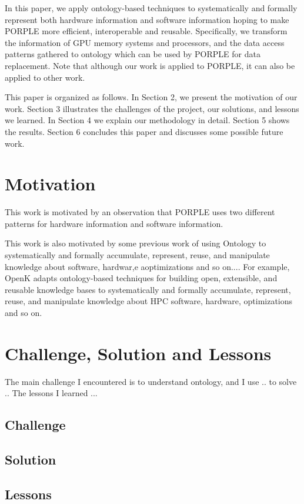 \documentclass{sig-alternate}
\begin{document}
In this paper, we apply ontology-based techniques to systematically and formally represent both hardware information and software information hoping to make PORPLE more efficient, interoperable and reusable. Specifically, we transform the information of GPU memory systems and processors, and the data access patterns gathered to ontology which can be used by PORPLE for data replacement. Note that although our work is applied to PORPLE, it can also be applied to other work.

This paper is organized as follows. In Section 2, we present the motivation of our work. Section 3 illustrates the challenges of the project, our solutions, and lessons we learned. In Section 4 we explain our methodology in detail. Section 5 shows the results. Section 6 concludes this paper and discusses some possible future work.

\section{Motivation}
This work is motivated by an observation that PORPLE uses two different patterns for hardware information and software information.

This work is also motivated by some previous work of using Ontology to systematically and formally accumulate, represent, reuse, and manipulate knowledge about software, hardwar,e aoptimizations and so on.... For example, OpenK \cite{OpenK} adapts ontology-based techniques for building open, extensible, and reusable knowledge bases to systematically and formally accumulate, represent, reuse, and manipulate knowledge about HPC software, hardware, optimizations and so on.

\section{Challenge, Solution and Lessons}
The main challenge I encountered is to understand ontology, and I use .. to solve .. The lessons I learned ...

\subsection{Challenge}

\subsection{Solution}

\subsection{Lessons}
\end{document}
